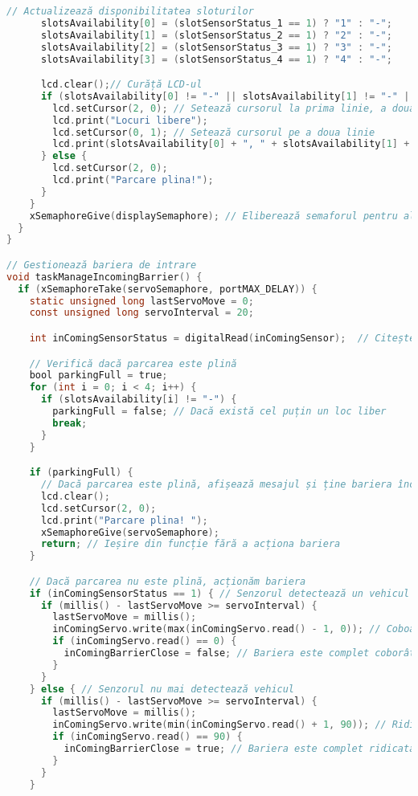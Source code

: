 \documentclass[a4paper,11pt]{report}
\begin{document}
\begin{lstlisting}[language=C]
      // Actualizează disponibilitatea sloturilor
      slotsAvailability[0] = (slotSensorStatus_1 == 1) ? "1" : "-";
      slotsAvailability[1] = (slotSensorStatus_2 == 1) ? "2" : "-";
      slotsAvailability[2] = (slotSensorStatus_3 == 1) ? "3" : "-";
      slotsAvailability[3] = (slotSensorStatus_4 == 1) ? "4" : "-";

      lcd.clear();// Curăță LCD-ul
      if (slotsAvailability[0] != "-" || slotsAvailability[1] != "-" || slotsAvailability[2] != "-" || slotsAvailability[3] != "-") {
        lcd.setCursor(2, 0); // Setează cursorul la prima linie, a doua coloană
        lcd.print("Locuri libere");
        lcd.setCursor(0, 1); // Setează cursorul pe a doua linie
        lcd.print(slotsAvailability[0] + ", " + slotsAvailability[1] + ", " + slotsAvailability[2] + ", " + slotsAvailability[3]);
      } else {
        lcd.setCursor(2, 0);
        lcd.print("Parcare plina!");
      }
    }
    xSemaphoreGive(displaySemaphore); // Eliberează semaforul pentru alte taskuri
  }
}

// Gestionează bariera de intrare
void taskManageIncomingBarrier() {
  if (xSemaphoreTake(servoSemaphore, portMAX_DELAY)) {
    static unsigned long lastServoMove = 0;
    const unsigned long servoInterval = 20;

    int inComingSensorStatus = digitalRead(inComingSensor);  // Citește statusul senzorului de intrare

    // Verifică dacă parcarea este plină
    bool parkingFull = true;
    for (int i = 0; i < 4; i++) {
      if (slotsAvailability[i] != "-") {
        parkingFull = false; // Dacă există cel puțin un loc liber
        break;
      }
    }

    if (parkingFull) {
      // Dacă parcarea este plină, afișează mesajul și ține bariera închisă
      lcd.clear();
      lcd.setCursor(2, 0);
      lcd.print("Parcare plina! ");
      xSemaphoreGive(servoSemaphore);
      return; // Ieșire din funcție fără a acționa bariera
    }

    // Dacă parcarea nu este plină, acționăm bariera
    if (inComingSensorStatus == 1) { // Senzorul detectează un vehicul
      if (millis() - lastServoMove >= servoInterval) {
        lastServoMove = millis();
        inComingServo.write(max(inComingServo.read() - 1, 0)); // Coboară bariera
        if (inComingServo.read() == 0) {
          inComingBarrierClose = false; // Bariera este complet coborâtă
        }
      }
    } else { // Senzorul nu mai detectează vehicul
      if (millis() - lastServoMove >= servoInterval) {
        lastServoMove = millis();
        inComingServo.write(min(inComingServo.read() + 1, 90)); // Ridică bariera
        if (inComingServo.read() == 90) {
          inComingBarrierClose = true; // Bariera este complet ridicată
        }
      }
    }


\end{lstlisting}
\end{document}
